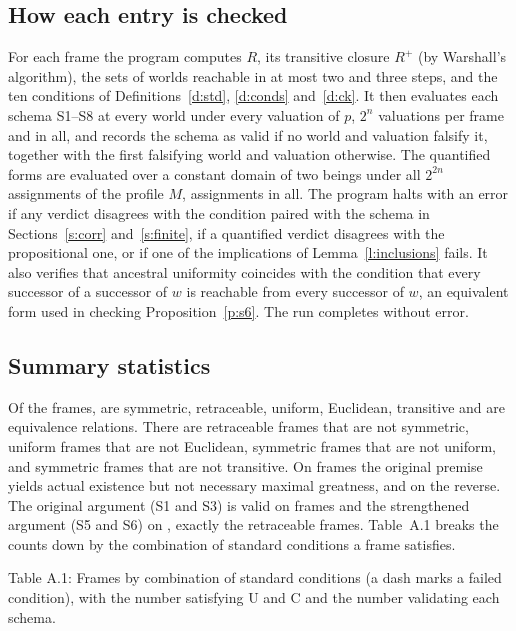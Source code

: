 \documentclass{situationist-preprint}
\newcommand{\Rp}{R^{+}}
\begin{document}
\subsection{How each entry is checked}

For each frame the program computes $R$, its transitive closure $\Rp$ (by Warshall's algorithm), the sets of worlds reachable in at most two and three steps, and the ten conditions of Definitions~\ref{d:std}, \ref{d:conds} and~\ref{d:ck}. It then evaluates each schema S1--S8 at every world under every valuation of $p$, $2^n$ valuations per frame and \stValuations{} in all, and records the schema as valid if no world and valuation falsify it, together with the first falsifying world and valuation otherwise. The quantified forms are evaluated over a constant domain of two beings under all $2^{2n}$ assignments of the profile $M$, \stQValuations{} assignments in all. The program halts with an error if any verdict disagrees with the condition paired with the schema in Sections~\ref{s:corr} and~\ref{s:finite}, if a quantified verdict disagrees with the propositional one, or if one of the implications of Lemma~\ref{l:inclusions} fails. It also verifies that ancestral uniformity coincides with the condition that every successor of a successor of $w$ is reachable from every successor of $w$, an equivalent form used in checking Proposition~\ref{p:s6}. The run completes without error.

\subsection{Summary statistics}

Of the \stTotal{} frames, \stNumB{} are symmetric, \stNumC{} retraceable, \stNumU{} uniform, \stNumFive{} Euclidean, \stNumFour{} transitive and \stNumSFive{} are equivalence relations. There are \stNumCnotB{} retraceable frames that are not symmetric, \stNumUnotFive{} uniform frames that are not Euclidean, \stNumBnotU{} symmetric frames that are not uniform, and \stNumBnotFour{} symmetric frames that are not transitive. On \stNumSOneNotSThree{} frames the original premise yields actual existence but not necessary maximal greatness, and on \stNumSThreeNotSOne{} the reverse. The original argument (S1 and S3) is valid on \stNumArgOrig{} frames and the strengthened argument (S5 and S6) on \stNumArgStar, exactly the retraceable frames. Table~A.1 breaks the counts down by the combination of standard conditions a frame satisfies.

\begin{center}\small Table A.1: Frames by combination of standard conditions (a dash marks a failed condition), with the number satisfying U and C and the number validating each schema.\end{center}

\end{document}

